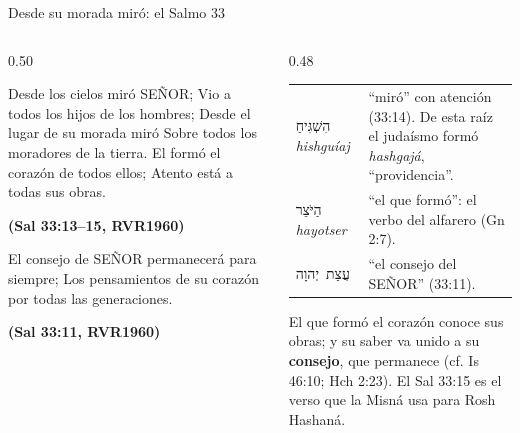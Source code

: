 \documentclass[hyperref={bookmarks=false},aspectratio=169]{beamer}
\newcommand{\heb}[1]{\mbox{\foreignlanguage{hebrew}{#1}}}
\newcommand{\SENOR}{S{\fontsize{0.78em}{1em}\selectfont EÑOR}}
\newcommand{\fuente}[1]{\par\hfill{\upshape\bfseries\footnotesize\textcolor{azul}{#1}}}
\newcommand{\destacar}[1]{\textbf{\textcolor{azul}{#1}}}
\begin{document}
\begin{frame}{Desde su morada miró: el Salmo 33}
\begin{columns}[t,onlytextwidth]
\begin{column}{0.50\textwidth}
\begin{cita}Desde los cielos miró \SENOR{}; Vio a todos los hijos de los hombres; Desde el lugar de su morada miró Sobre todos los moradores de la tierra. El formó el corazón de todos ellos; Atento está a todas sus obras.\fuente{(Sal 33:13--15, RVR1960)}\end{cita}
\begin{cita}El consejo de \SENOR{} permanecerá para siempre; Los pensamientos de su corazón por todas las generaciones.\fuente{(Sal 33:11, RVR1960)}\end{cita}
\end{column}
\begin{column}{0.48\textwidth}\scriptsize
\renewcommand{\arraystretch}{1.1}
\begin{tabular}{@{}>{\RaggedRight\arraybackslash}p{1.8cm}>{\RaggedRight\arraybackslash}p{3.6cm}@{}}
\toprule
\heb{הִשְׁגִּיחַ} \emph{hishguíaj} & ``miró'' con atención (33:14). De esta raíz el judaísmo formó \emph{hashgajá}, ``providencia''. \\
\heb{הַיֹּצֵר} \emph{hayotser} & ``el que formó'': el verbo del alfarero (Gn 2:7). \\
\heb{עֲצַת יְהוָה} & ``el consejo del \SENOR{}'' (33:11). \\
\bottomrule
\end{tabular}\par\smallskip
\small El que formó el corazón conoce sus obras; y su saber va unido a su \destacar{consejo}, que permanece (cf. Is 46:10; Hch 2:23). El Sal 33:15 es el verso que la Misná usa para Rosh Hashaná.
\end{column}
\end{columns}
\end{frame}
\end{document}
